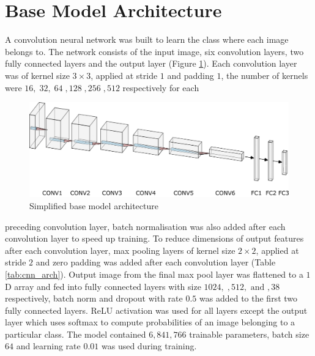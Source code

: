 \documentclass[12pt]{report}
\numberwithin{equation}{section}
\begin{document}
\section{Base Model Architecture}
A convolution neural network was built to learn the class where each image belongs to. The network consists of the input image, six convolution layers, two fully connected layers and the output layer (Figure \ref{fig:cnn_arch}). Each convolution layer was of kernel size $3 \times 3$, applied at stride $1$ and padding $1$, the number of kernels were $16,\;32,\;64\;,128\;,256\;,512$ respectively for each 
\begin{figure}[H]
\centering
\includegraphics[scale=0.5]{png/drawing_nn.png}
\caption{Simplified base model architecture}
\label{fig:cnn_arch}
\end{figure} \noindent 
preceding convolution layer, batch normalisation was also added after each convolution layer to speed up training. To reduce dimensions of output features after each convolution layer, max pooling layers of kernel size $2 \times 2$, applied at stride $2$ and zero padding was added after each convolution layer (Table \ref{tab:cnn_arch}). Output image from the final max pool layer was flattened to a $1$D array and fed into fully connected layers with size $1024, \;, 512, \text{ and }, 38$ respectively, batch norm and dropout with rate $0.5$ was added to the first two fully connected layers. ReLU activation was used for all layers except the output layer which uses softmax to compute probabilities of an image belonging to a particular class. The model contained $6,841,766$ trainable parameters, batch size $64$ and learning rate $0.01$ was used during training. 
\end{document}
